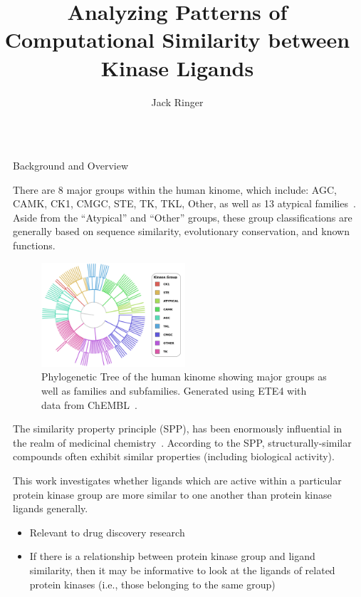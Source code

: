 \documentclass[final]{beamer}
\title{Analyzing Patterns of Computational Similarity between Kinase Ligands}
\author{Jack Ringer}
\institute[shortinst]{University of New Mexico\\8/4/2025}
\newlength{\sepwidth}
\newlength{\colwidth}
\newcommand{\separatorcolumn}{\begin{column}{\sepwidth}\end{column}}
\begin{document}
\begin{frame}[t]
\begin{columns}[t]
\separatorcolumn

\begin{column}{\colwidth}

  \begin{block}{Background and Overview}
   \small

 There are 8 major groups within the human kinome, which include: AGC, CAMK, CK1, CMGC, STE, TK, TKL, Other, as well as 13 atypical families~\cite{eid_turk_volkamer_rippmann_fulle_2017, manning_2002}. Aside from the ``Atypical'' and ``Other'' groups, these group classifications are generally based on sequence similarity, evolutionary conservation, and known functions. 

\begin{figure}[H]
    \centering
    \includegraphics[width=0.5\textwidth]{../figures/protein_family_tree.png}
    \caption{Phylogenetic Tree of the human kinome showing major groups as well as families and subfamilies. Generated using ETE4 with data from ChEMBL~\cite{chembl_db_2023}.}
    \label{fig:fam_tree}
\end{figure}

The similarity property principle (SPP), has been enormously influential in the realm of medicinal chemistry~\cite{maggiora_vogt_stumpfe_bajorath_2013}. According to the SPP, structurally-similar compounds often exhibit similar properties (including biological activity). 

This work investigates whether ligands which are active within a particular protein kinase group are more similar to one another than protein kinase ligands generally. 
    \begin{itemize}
        \item Relevant to drug discovery research
        \item If there is a relationship between protein kinase group and ligand similarity, then it may be informative to look at the ligands of related protein kinases (i.e., those belonging to the same group)
    \end{itemize}


\end{block}
\end{column}
\end{columns}
\end{frame}
\end{document}
